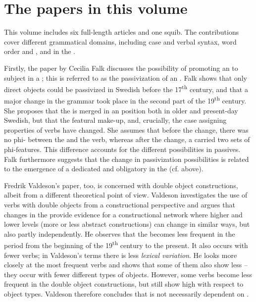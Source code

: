 \documentclass[output=paper]{langscibook}
\begin{document}
\section{The papers in this volume}\label{sec:intro:4}


This volume includes six full-length articles and one squib. The contributions cover different grammatical domains, including case and verbal syntax, word order and , and  in the . 



Firstly, the paper by Cecilia Falk discusses the possibility of promoting an  to subject in a ; this is referred to as the passivization of an . Falk shows that only direct objects could be passivized in Swedish before the 17\textsuperscript{th} century, and that a major change in the grammar took place in the second part of the 19\textsuperscript{th} century. She proposes that the  is merged in an  position both in older and present-day Swedish, but that the featural make-up, and, crucially, the case assigning properties of  verbs have changed. She assumes that before the change, there was no phi- between the  and the verb, whereas after the change, a  carried two sets of phi-features. This difference accounts for the different possibilities in passives. Falk furthermore suggests that the change in passivization possibilities is related to the emergence of a dedicated and obligatory  in the  (cf.  above).



Fredrik Valdeson’s paper, too, is concerned with double object constructions, albeit from a different theoretical point of view. Valdeson investigates the use of verbs with double objects from a constructional perspective and argues that changes in the  provide evidence for a constructional network where higher and lower levels (more or less abstract constructions) can change in similar ways, but also partly independently. He observes that the  becomes less frequent in the period from the beginning of the 19\textsuperscript{th} century to the present. It also occurs with fewer verbs; in Valdeson’s terms there is less \textit{lexical variation}. He looks more closely at the most frequent verbs and shows that some of them also show less  – they occur with fewer different types of objects. However, some verbs become less frequent in the double object constructions, but still show high  with respect to object types. Valdeson therefore concludes that  is not necessarily dependent on .
\end{document}
